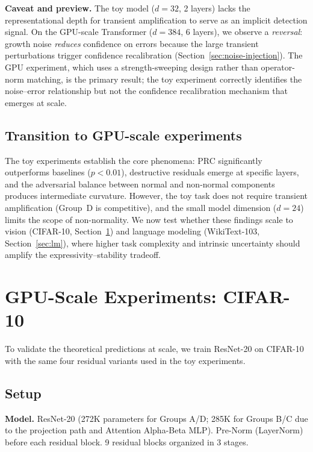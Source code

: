 \documentclass[11pt,a4paper]{article}
\theoremstyle{definition}
\begin{document}
\textbf{Caveat and preview.}
The toy model ($d = 32$, 2 layers) lacks the representational depth
for transient amplification to serve as an implicit detection signal.
On the GPU-scale Transformer ($d = 384$, 6 layers), we observe a
\emph{reversal}: growth noise \emph{reduces} confidence on errors
because the large transient perturbations trigger confidence
recalibration (Section~\ref{sec:noise-injection}). The GPU experiment,
which uses a strength-sweeping design rather than operator-norm
matching, is the primary result; the toy experiment correctly
identifies the noise--error relationship but not the confidence
recalibration mechanism that emerges at scale.

\subsection{Transition to GPU-scale experiments}

The toy experiments establish the core phenomena: PRC significantly
outperforms baselines ($p < 0.01$), destructive residuals emerge
at specific layers, and the adversarial balance between normal and
non-normal components produces intermediate curvature. However,
the toy task does not require transient amplification (Group~D is
competitive), and the small model dimension ($d = 24$) limits the
scope of non-normality. We now test whether these findings scale to
vision (CIFAR-10, Section~\ref{sec:cifar}) and language modeling
(WikiText-103, Section~\ref{sec:lm}), where higher task complexity
and intrinsic uncertainty should amplify the expressivity--stability
tradeoff.

\section{GPU-Scale Experiments: CIFAR-10}
\label{sec:cifar}

To validate the theoretical predictions at scale, we train ResNet-20
on CIFAR-10 with the same four residual variants used in the toy
experiments.

\subsection{Setup}

\textbf{Model.} ResNet-20 (272K parameters for Groups A/D; 285K for
Groups B/C due to the projection path and Attention Alpha-Beta MLP).
Pre-Norm (LayerNorm) before each residual block. 9 residual blocks
organized in 3 stages.
\end{document}

